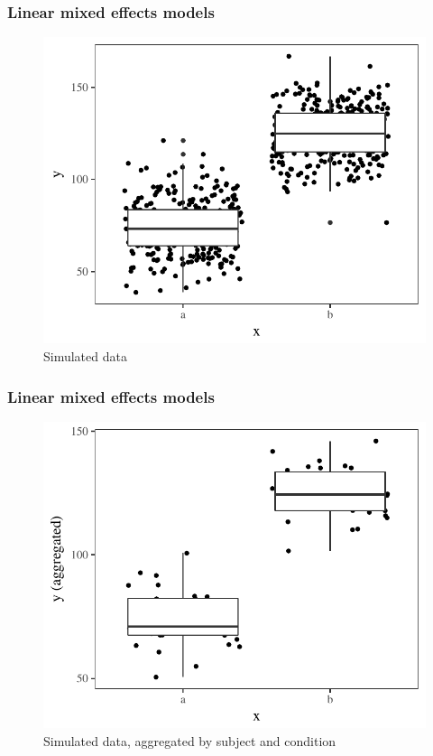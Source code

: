 \begin{frame}
	\frametitle{Linear mixed effects models}
	
	\begin{figure}
		\includegraphics[scale = .6]{gfx/rawdata.pdf}
		\caption{Simulated data}
	\end{figure}
	
\end{frame}


\begin{frame}
	\frametitle{Linear mixed effects models}
	
	\begin{figure}
		\includegraphics[scale = .6]{gfx/aggregateddata.pdf}
		\caption{Simulated data, aggregated by subject and condition}
		\end{figure}
		
\end{frame}

